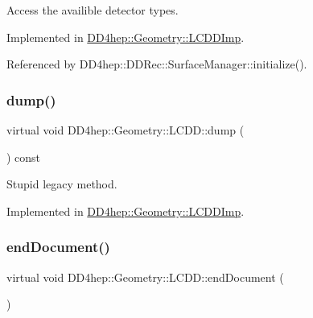 Access the availible detector types. 



Implemented in \hyperlink{class_d_d4hep_1_1_geometry_1_1_l_c_d_d_imp_a9ee7513efc234c9158b19cdffb642a6b}{D\+D4hep\+::\+Geometry\+::\+L\+C\+D\+D\+Imp}.



Referenced by D\+D4hep\+::\+D\+D\+Rec\+::\+Surface\+Manager\+::initialize().

\hypertarget{class_d_d4hep_1_1_geometry_1_1_l_c_d_d_aa67b3fbf93d48e08c08b60cdd83b729f}{}\label{class_d_d4hep_1_1_geometry_1_1_l_c_d_d_aa67b3fbf93d48e08c08b60cdd83b729f} 
\subsubsection{\texorpdfstring{dump()}{dump()}}
{\footnotesize\ttfamily virtual void D\+D4hep\+::\+Geometry\+::\+L\+C\+D\+D\+::dump (\begin{DoxyParamCaption}{ }\end{DoxyParamCaption}) const\hspace{0.3cm}{\ttfamily [pure virtual]}}



Stupid legacy method. 



Implemented in \hyperlink{class_d_d4hep_1_1_geometry_1_1_l_c_d_d_imp_a0194b8c2b0af774894f606ed48e205db}{D\+D4hep\+::\+Geometry\+::\+L\+C\+D\+D\+Imp}.

\hypertarget{class_d_d4hep_1_1_geometry_1_1_l_c_d_d_abe2147b8363040ce95bb40f810d95b36}{}\label{class_d_d4hep_1_1_geometry_1_1_l_c_d_d_abe2147b8363040ce95bb40f810d95b36} 
\subsubsection{\texorpdfstring{end\+Document()}{endDocument()}}
{\footnotesize\ttfamily virtual void D\+D4hep\+::\+Geometry\+::\+L\+C\+D\+D\+::end\+Document (\begin{DoxyParamCaption}{ }\end{DoxyParamCaption})\hspace{0.3cm}{\ttfamily [pure virtual]}}



